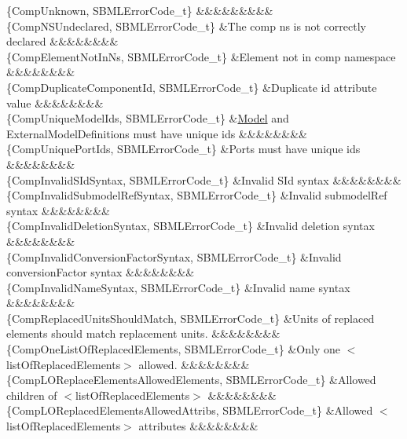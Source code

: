 \begin{DoxyParagraph}{}
\begin{longtabu}
\{Comp\+Unknown, S\+B\+M\+L\+Error\+Code\+\_\+t\} &&&&&&&&&\\
\{Comp\+N\+S\+Undeclared, S\+B\+M\+L\+Error\+Code\+\_\+t\} &The comp ns is not correctly declared &&&&&&&&\\
\{Comp\+Element\+Not\+In\+Ns, S\+B\+M\+L\+Error\+Code\+\_\+t\} &Element not in comp namespace &&&&&&&&\\
\{Comp\+Duplicate\+Component\+Id, S\+B\+M\+L\+Error\+Code\+\_\+t\} &Duplicate \textquotesingle{}id\textquotesingle{} attribute value &&&&&&&&\\
\{Comp\+Unique\+Model\+Ids, S\+B\+M\+L\+Error\+Code\+\_\+t\} &\hyperlink{class_model}{Model} and External\+Model\+Definitions must have unique ids &&&&&&&&\\
\{Comp\+Unique\+Port\+Ids, S\+B\+M\+L\+Error\+Code\+\_\+t\} &Ports must have unique ids &&&&&&&&\\
\{Comp\+Invalid\+S\+Id\+Syntax, S\+B\+M\+L\+Error\+Code\+\_\+t\} &Invalid S\+Id syntax &&&&&&&&\\
\{Comp\+Invalid\+Submodel\+Ref\+Syntax, S\+B\+M\+L\+Error\+Code\+\_\+t\} &Invalid submodel\+Ref syntax &&&&&&&&\\
\{Comp\+Invalid\+Deletion\+Syntax, S\+B\+M\+L\+Error\+Code\+\_\+t\} &Invalid deletion syntax &&&&&&&&\\
\{Comp\+Invalid\+Conversion\+Factor\+Syntax, S\+B\+M\+L\+Error\+Code\+\_\+t\} &Invalid conversion\+Factor syntax &&&&&&&&\\
\{Comp\+Invalid\+Name\+Syntax, S\+B\+M\+L\+Error\+Code\+\_\+t\} &Invalid name syntax &&&&&&&&\\
\{Comp\+Replaced\+Units\+Should\+Match, S\+B\+M\+L\+Error\+Code\+\_\+t\} &Units of replaced elements should match replacement units. &&&&&&&&\\
\{Comp\+One\+List\+Of\+Replaced\+Elements, S\+B\+M\+L\+Error\+Code\+\_\+t\} &Only one {\ttfamily $<$list\+Of\+Replaced\+Elements$>$} allowed. &&&&&&&&\\
\{Comp\+L\+O\+Replace\+Elements\+Allowed\+Elements, S\+B\+M\+L\+Error\+Code\+\_\+t\} &Allowed children of {\ttfamily $<$list\+Of\+Replaced\+Elements$>$} &&&&&&&&\\
\{Comp\+L\+O\+Replaced\+Elements\+Allowed\+Attribs, S\+B\+M\+L\+Error\+Code\+\_\+t\} &Allowed {\ttfamily $<$list\+Of\+Replaced\+Elements$>$} attributes &&&&&&&&\\

\end{longtabu}
\end{DoxyParagraph}

